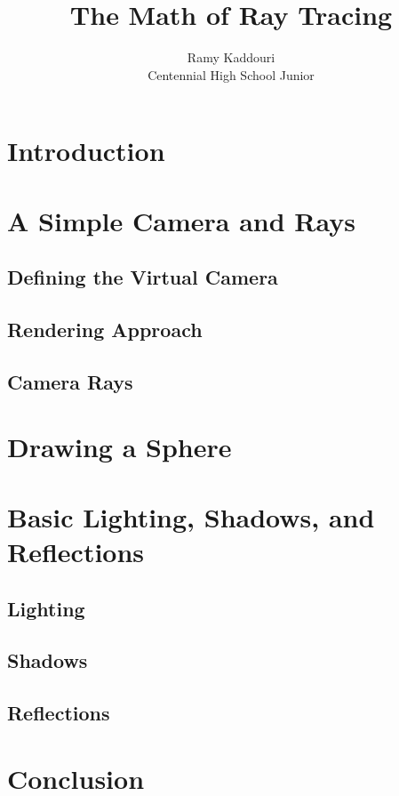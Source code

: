 
\title{The Math of Ray Tracing}
\author{Ramy Kaddouri \\ Centennial High School Junior}
\date{}



\maketitle

\section{Introduction}
    
\section{A Simple Camera and Rays}
    \subsection{Defining the Virtual Camera}
        
    \subsection{Rendering Approach}
        
    \subsection{Camera Rays}
        
\section{Drawing a Sphere}
    
\section{Basic Lighting, Shadows, and Reflections}
    \subsection{Lighting}
        
    \subsection{Shadows}
        
    \subsection{Reflections}
        
\section{Conclusion}
    


